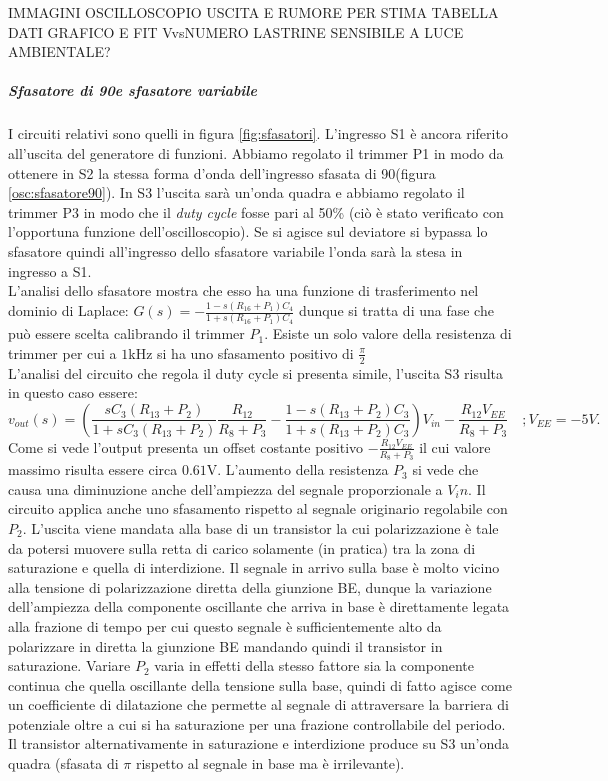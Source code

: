 \documentclass[10pt,a4paper]{article}
\begin{document}
IMMAGINI OSCILLOSCOPIO USCITA E RUMORE PER STIMA
TABELLA DATI
GRAFICO E FIT VvsNUMERO LASTRINE
SENSIBILE A LUCE AMBIENTALE?

\subparagraph{Sfasatore di 90\degree e sfasatore variabile}
I circuiti relativi sono quelli in figura \ref{fig:sfasatori}. L'ingresso S1 è ancora riferito all'uscita del generatore di funzioni. Abbiamo regolato il trimmer P1 in modo da ottenere in S2 la stessa forma d'onda dell'ingresso sfasata di 90\degree (figura \ref{osc:sfasatore90}). In S3 l'uscita sarà un'onda quadra e abbiamo regolato il trimmer P3 in modo che il \emph{duty cycle} fosse pari al 50\% (ciò è stato verificato con l'opportuna funzione dell'oscilloscopio). Se si agisce sul deviatore si bypassa lo sfasatore quindi all'ingresso dello sfasatore variabile l'onda sarà la stesa in ingresso a S1.\\
L'analisi dello sfasatore mostra che esso ha una funzione di trasferimento nel dominio di Laplace: $G(s) = -\frac{1-s(R_{16} +P_1) C_{4}}{1+s(R_{16} + P_1)C_{4}}$ dunque si tratta di una fase che può essere scelta calibrando il trimmer $P_1$. Esiste un solo valore della resistenza di trimmer per cui a $1$kHz si ha uno sfasamento positivo di $\frac{\pi}{2}$\\
L'analisi del circuito che regola il duty cycle si presenta simile, l'uscita S3 risulta in questo caso essere:
\begin{equation}
v_{out}(s) = \left( \frac{s C_3 (R_{13} + P_2)}{1 + s C_3 (R_{13} + P_2)} \frac{R_{12}}{R_8+P_3} -\frac{1-s(R_{13} +P_2) C_{3}}{1+s(R_{13} + P_2)C_{3}} \right) V_{in}-\frac{R_{12} V_{EE}}{R_8+P_3}
\, \, \, \, \, \, ; V_{EE} = -5V.
\end{equation}
Come si vede l'output presenta un offset costante positivo $-\frac{R_{12} V_{EE}}{R_8+P_3}$ il cui valore massimo risulta essere circa $0.61$V. L'aumento della resistenza $P_3$ si vede che causa una diminuzione anche dell'ampiezza del segnale proporzionale a $V_in$. 
Il circuito applica anche uno sfasamento rispetto al segnale originario regolabile con $P_2$. L'uscita viene mandata alla base di un transistor la cui polarizzazione è tale da potersi muovere sulla retta di carico solamente (in pratica) tra la zona di saturazione e quella di interdizione. Il segnale in arrivo sulla base è molto vicino alla tensione di polarizzazione diretta della giunzione BE, dunque la variazione dell'ampiezza della componente oscillante che arriva in base è direttamente legata alla frazione di tempo per cui questo segnale è sufficientemente alto da polarizzare in diretta la giunzione BE mandando quindi il transistor in saturazione. Variare $P_2$ varia in effetti della stesso fattore sia la componente continua che quella oscillante della tensione sulla base, quindi di fatto agisce come un coefficiente di dilatazione che permette al segnale di attraversare la barriera di potenziale oltre a cui si ha saturazione per una frazione controllabile del periodo.
Il transistor alternativamente in saturazione e interdizione produce su S3 un'onda quadra (sfasata di $\pi$ rispetto al segnale in base ma è irrilevante).\\
\end{document}
